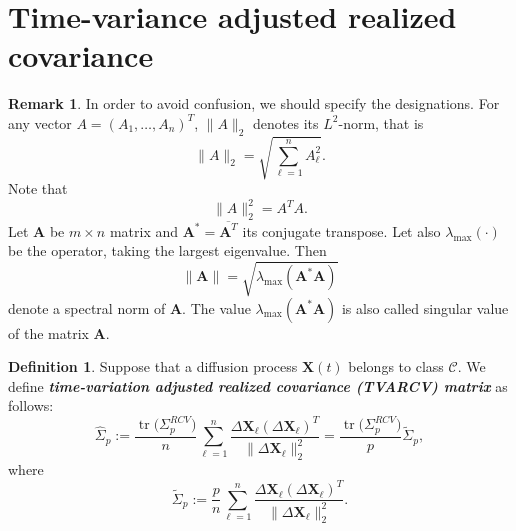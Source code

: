\documentclass[a4paper,11pt]{article}
\theoremstyle{plain}
\theoremstyle{definition}
\newtheorem{defn}[thm]{Definition}
\newtheorem{rmrk}[thm]{Remark}
\newcommand{\tr}{\operatorname{tr}}
\newcommand{\define}[1]{\textit{\textbf{#1}}}
\begin{document}
    \section*{Time-variance adjusted realized covariance}
    
    \begin{rmrk}
    	In order to avoid confusion, we should specify the designations. For any vector $A = (A_1, \dots, A_n)^T$, $\|A\|_2$ denotes its $L^2$-norm, that is
    	\[ \|A\|_2 = \sqrt{\sum_{\ell=1}^n A_\ell^2 }. \]
    	Note that
    	\[ \|A\|_2^2 = A^T A. \]
    	Let $\mathbf{A}$ be $m \times n$ matrix and $\mathbf{A}^* = \overline{\mathbf{A}^T}$ its conjugate transpose. Let also $\lambda_{\max}(\cdot)$ be the operator, taking the largest eigenvalue. Then
    	\[ \|\mathbf{A} \| = \sqrt{\lambda_{\max} (\mathbf{A}^* \mathbf{A}) } \]
    	denote a spectral norm of $\mathbf{A}$. The value $\lambda_{\max} (\mathbf{A}^* \mathbf{A})$ is also called singular value of the matrix $\mathbf{A}$.
    \end{rmrk}
    		
    \begin{defn}
   		Suppose that a diffusion process $\mathbf{X}(t)$ belongs to class $\mathcal{C}$. We define \define{time-variation adjusted realized covariance (TVARCV) matrix} as follows:
   		\begin{equation} \label{TVARCV}
   		\widehat{\Sigma}_p := \frac{\tr \big( \Sigma_p^{RCV} \big) }{n} \sum_{\ell = 1}^{n} \frac{\Delta \mathbf{X}_\ell (\Delta \mathbf{X}_\ell)^T}{\| \Delta \mathbf{X}_\ell \|_2^2} = \frac{\tr \big( \Sigma_p^{RCV} \big) }{p} \widetilde{\Sigma}_p,
   		\end{equation}
   		where
   		\begin{equation} \label{Sigma_tilde}
   		\widetilde{\Sigma}_p := \frac{p}{n} \sum_{\ell = 1}^{n} \frac{\Delta \mathbf{X}_\ell (\Delta \mathbf{X}_\ell)^T}{\| \Delta \mathbf{X}_\ell \|_2^2}.
   		\end{equation}
    \end{defn}
    
\end{document}
